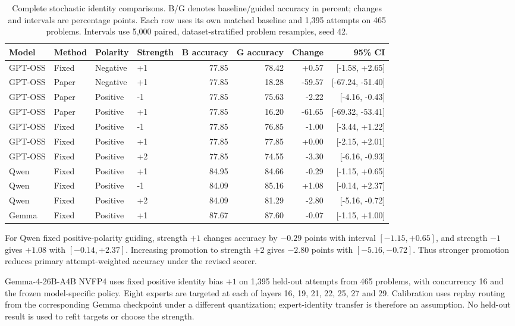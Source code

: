 \documentclass[12pt,a4paper,twoside,openright]{book}
\begin{document}
\begin{table}[!ht]
\centering\small
\caption{Complete stochastic identity comparisons. B/G denotes baseline/guided accuracy in percent; changes and intervals are percentage points. Each row uses its own matched baseline and 1,395 attempts on 465 problems. Intervals use 5,000 paired, dataset-stratified problem resamples, seed 42.}
\label{tab:res-identity}
\begin{adjustbox}{max width=\linewidth}%
\begin{tabular}{llllrrrr}
\toprule
Model & Method & Polarity & Strength & B accuracy & G accuracy & Change & 95\% CI \\
\midrule
GPT-OSS & Fixed & Negative & +1 & 77.85 & 78.42 & +0.57 & [-1.58, +2.65] \\
GPT-OSS & Paper & Negative & +1 & 77.85 & 18.28 & -59.57 & [-67.24, -51.40] \\
GPT-OSS & Paper & Positive & -1 & 77.85 & 75.63 & -2.22 & [-4.16, -0.43] \\
GPT-OSS & Paper & Positive & +1 & 77.85 & 16.20 & -61.65 & [-69.32, -53.41] \\
GPT-OSS & Fixed & Positive & -1 & 77.85 & 76.85 & -1.00 & [-3.44, +1.22] \\
GPT-OSS & Fixed & Positive & +1 & 77.85 & 77.85 & +0.00 & [-2.15, +2.01] \\
GPT-OSS & Fixed & Positive & +2 & 77.85 & 74.55 & -3.30 & [-6.16, -0.93] \\
Qwen & Fixed & Positive & +1 & 84.95 & 84.66 & -0.29 & [-1.15, +0.65] \\
Qwen & Fixed & Positive & -1 & 84.09 & 85.16 & +1.08 & [-0.14, +2.37] \\
Qwen & Fixed & Positive & +2 & 84.09 & 81.29 & -2.80 & [-5.16, -0.72] \\
Gemma & Fixed & Positive & +1 & 87.67 & 87.60 & -0.07 & [-1.15, +1.00] \\
\bottomrule
\end{tabular}
\end{adjustbox}
\end{table}


For Qwen fixed positive-polarity guiding, strength $+1$ changes accuracy
by $-0.29$ points with interval $[-1.15,+0.65]$, and strength $-1$ gives
$+1.08$ with $[-0.14,+2.37]$. Increasing promotion to strength $+2$
gives $-2.80$ points with $[-5.16,-0.72]$. Thus stronger promotion
reduces primary attempt-weighted accuracy under the revised scorer.

Gemma-4-26B-A4B NVFP4 uses fixed positive
identity bias $+1$ on 1,395 held-out attempts from 465 problems, with
concurrency 16 and the frozen model-specific policy. Eight experts are
targeted at each of layers 16, 19, 21, 22, 25, 27 and 29. Calibration
uses replay routing from the corresponding Gemma checkpoint under a
different quantization; expert-identity transfer is therefore an assumption.
No held-out result is used to refit targets or choose the strength.
\end{document}
